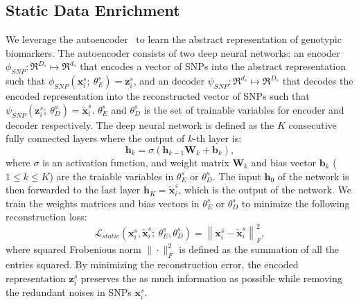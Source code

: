 \subsection{Static Data Enrichment}
We leverage the autoencoder~\cite{kramer1991nonlinear} to learn the abstract representation of genotypic biomarkers. The autoencoder consists of two deep neural networks: an encoder $\phi_{SNP}: \Re^{D_s} \mapsto \Re^{d_s}$ that encodes a vector of SNPs into the abstract representation such that $\phi_{SNP}(\mathbf{x}_i^s;\ \theta^s_{E}) = \mathbf{z}_i^s$, and an decoder $\psi_{SNP}: \Re^{d_s} \mapsto \Re^{D_s}$ that decodes the encoded representation into the reconstructed vector of SNPs such that $\psi_{SNP}(\mathbf{z}_i^s;\ \theta^s_{D}) = \tilde{\mathbf{x}}_i^s$. $\theta_{E}^s$ and $\theta_{D}^s$ is the set of trainable variables for encoder and decoder respectively. The deep neural network is defined as the $K$ consecutive fully connected layers where the output of $k$-th layer is:
\begin{equation}
    \mathbf{h}_k = \sigma(\mathbf{h}_{k-1}\mathbf{W}_k + \mathbf{b}_k),
\end{equation}
where $\sigma$ is an activation function, and weight matrix $\mathbf{W}_k$ and bias vector $\mathbf{b}_k$ ($1 \leq k \leq K$) are the traiable variables in $\theta_{E}^s$ or $\theta_{D}^s$.
The input $\mathbf{h}_0$ of the network is then forwarded to the last layer $\mathbf{h}_K = \tilde{\mathbf{x}}_i^s$, which is the output of the network. We train the weights matrices and bias vectors in $\theta_{E}^s$ or $\theta_{D}^s$ to minimize the following reconstruction loss:
\begin{equation}
    \mathcal{L}_{static}(\mathbf{x}_i^s, \tilde{\mathbf{x}}_i^s;\ \theta_{E}^s, \theta_{D}^s) = \left\|\mathbf{x}_i^s - \tilde{\mathbf{x}}_i^s\right\|_F^2,
\end{equation}
where squared Frobenious norm $\| \cdot \|_F^2$ is defined as the summation of all the entries squared. By minimizing the reconstruction error, the encoded representation $\mathbf{z}_i^s$ preserves the as much information as possible while removing the redundant noises in SNPs $\mathbf{x}_i^s$.


